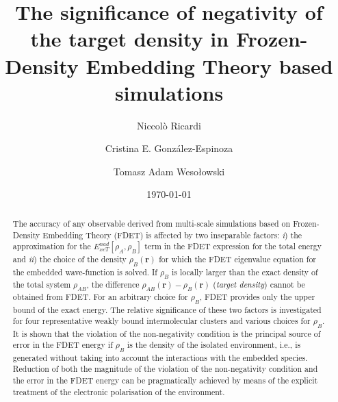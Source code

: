 \documentclass[amsmath,amssymb,preprint,aip,jcp]{revtex4-1}
\begin{document}
\author{Niccol\`{o} Ricardi}
\author{Cristina E. Gonz\'{a}lez-Espinoza}
\author{Tomasz Adam Weso\l{}owski}
% 
\date{\today}
\title{The significance of negativity of the target density in Frozen-Density Embedding Theory based simulations}
 
\begin{abstract}
The accuracy of any observable derived from multi-scale simulations based on Frozen-Density Embedding Theory (FDET) is affected by two inseparable factors: {\it i}) the approximation for the  ${E}_{xcT}^{nad}[\rho_A,\rho_B]$ 
term in the FDET expression for the total energy and  {\it ii}) the choice of the density $\rho_B(\mathbf{r})$
for which the FDET eigenvalue equation for the embedded wave-function is solved.
If $\rho_B$ is locally larger than the exact density of the total system $\rho_{AB}$, the difference 
$\rho_{AB}(\mathbf{r})-\rho_{B}(\mathbf{r})$ ({\it target density}) cannot be obtained from FDET. For an arbitrary choice for $\rho_B$, FDET provides only the upper bound of the exact energy.
The relative significance of these two factors is investigated for four representative weakly bound intermolecular clusters and various choices for $\rho_B$.
It is shown that the violation of the non-negativity condition is the principal source of error in the FDET energy
if $\rho_B$ is the density of the isolated environment, i.e., is generated without taking into account the interactions with the embedded species.
Reduction of both the magnitude of the violation of the non-negativity condition and the error in the FDET energy can be pragmatically achieved by means of the explicit treatment of the electronic polarisation of the environment.
\end{abstract}

\maketitle
\end{document}
